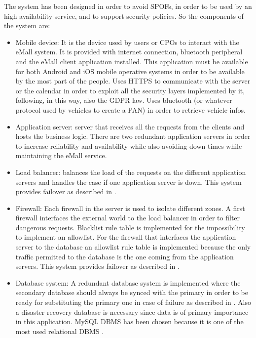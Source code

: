The system has been designed in order to avoid \acp{SPOF}, in order to be used by an high availability service, and to support security policies. So the components of the system are:
\begin{itemize}
    \item Mobile device: It is the device used by users or \acp{CPO} to interact with the \ac{eMall} system. It is provided with internet connection, bluetooth peripheral and the \ac{eMall} client application installed. This application must be available for both Android and iOS mobile operative systems in order to be available by the most part of the people.
          Uses \ac{HTTPS} to communicate with the server or the calendar in order to exploit all the security layers implemented by it, following, in this way, also the \ac{GDPR} law. Uses bluetooth (or whatever protocol used by vehicles to create a PAN) in order to retrieve vehicle infos.
    \item Application server: server that receives all the requests from the clients and hosts the business logic. There are two redundant application servers in order to increase reliability and availability while also avoiding down-times while maintaining the \ac{eMall} service.
    \item Load balancer: balances the load of the requests on the different application servers and handles the case if one application server is down. This system provides failover as described in \cite{ref:redundant-load-balancers}.
    \item Firewall: Each firewall in the server is used to isolate different zones. A first firewall interfaces the external world to the load balancer in order to filter dangerous requests.
          Blacklist rule table is implemented for the impossibility to implement an allowlist. For the firewall that interfaces the application server to the database an allowlist rule table is implemented because the only traffic permitted to the database is the one coming from the application servers. This system provides failover as described in \cite{ref:redundant-firewalls}.
    \item Database system: A redundant database system is implemented where the secondary database should always be synced with the primary in order to be ready for substituting the primary one in case of failure as described in \cite{ref:redundant-databases}. Also a disaster recovery database is necessary since data is of primary importance in this application. MySQL DBMS has been chosen because it is one of the most used relational DBMS \cite{ref:most-popular-RDBMS}.
\end{itemize}
